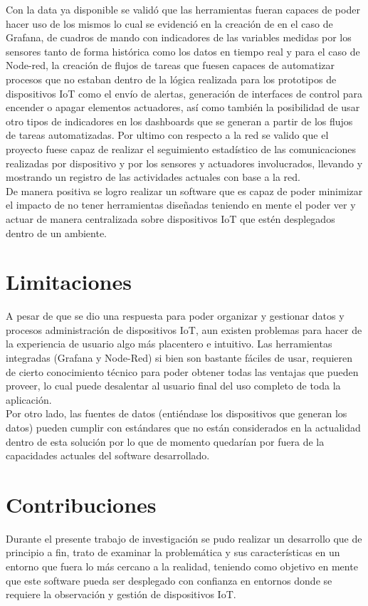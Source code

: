 Con la data ya disponible se validó que las herramientas fueran capaces de poder hacer uso de los mismos lo cual se evidenció en la creación de en el caso de Grafana, de cuadros de mando con indicadores de las variables medidas por los sensores tanto de forma histórica como los datos en tiempo real y para el caso de Node-red, la creación de flujos de tareas que fuesen capaces de automatizar procesos que no estaban dentro de la lógica realizada para los prototipos de dispositivos IoT como el envío de alertas, generación de interfaces de control para encender o apagar elementos actuadores, así como también la posibilidad de usar otro tipos de indicadores en los dashboards que se generan a partir de los flujos de tareas automatizadas. Por ultimo con respecto a la red se valido que el proyecto fuese capaz de realizar el seguimiento estadístico de las comunicaciones realizadas por dispositivo y por los sensores y actuadores involucrados, llevando y mostrando un registro de las actividades actuales con base a la red.\\

De manera positiva se logro realizar un software que es capaz de poder minimizar el impacto de no tener herramientas diseñadas teniendo en mente el poder ver y actuar de manera centralizada sobre dispositivos IoT que estén desplegados dentro de un ambiente.

\section{Limitaciones}
A pesar de que se dio una respuesta para poder organizar y gestionar datos y procesos administración de dispositivos IoT, aun existen problemas para hacer de la experiencia de usuario algo más placentero e intuitivo. Las herramientas integradas (Grafana y Node-Red) si bien son bastante fáciles de usar, requieren de cierto conocimiento técnico para poder obtener todas las ventajas que pueden proveer, lo cual puede desalentar al usuario final del uso completo de toda la aplicación.\\

Por otro lado, las fuentes de datos (entiéndase los dispositivos que generan los datos) pueden cumplir con estándares que no están considerados en la actualidad dentro de esta solución por lo que de momento quedarían por fuera de la capacidades actuales del software desarrollado.

\section{Contribuciones}
Durante el presente trabajo de investigación se pudo realizar un desarrollo que de principio a fin, trato de examinar la problemática y sus características en un entorno que fuera lo más cercano a la realidad, teniendo como objetivo en mente que este software pueda ser desplegado con confianza en entornos donde se requiere la observación y gestión de dispositivos IoT.\\


